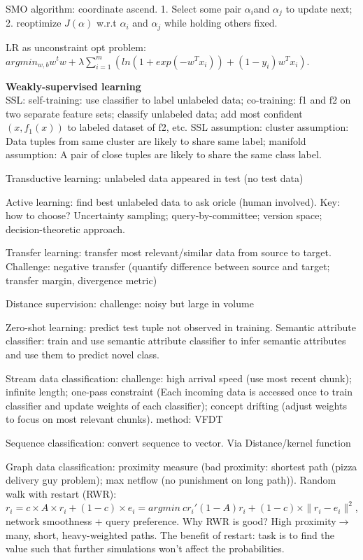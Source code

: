 \documentclass[10pt,twocolumn]{article}
\begin{document}
SMO algorithm: coordinate ascend. 1. Select some pair $\alpha_i$and $\alpha_j$ to update next; 2. reoptimize $J(\alpha)$ w.r.t $\alpha_i$ and $\alpha_j$ while holding others fixed. 

LR as unconstraint opt problem: $argmin_{w,b}w^tw+\lambda\sum_{i=1}^m(ln(1+exp(-w^Tx_i))+(1-y_i)w^Tx_i)$.

\textbf{Weakly-supervised learning}\\ 
SSL: self-training: use classifier to label unlabeled data; co-training: f1 and f2 on two separate feature sets; classify unlabeled data; add most confident $(x, f_1(x))$ to labeled dataset of f2, etc.
SSL assumption: cluster assumption: Data tuples from same cluster are likely to share same label; manifold assumption:  A pair of close tuples are likely to share the same class label. 

Transductive learning: unlabeled data appeared in test (no test data)

Active learning: find best unlabeled data to ask oricle (human involved). Key: how to choose? Uncertainty sampling; query-by-committee; version space; decision-theoretic approach.

Transfer learning: transfer most relevant/similar data from source to target. Challenge: negative transfer (quantify difference between source and target; transfer margin, divergence metric)

Distance supervision: challenge: noisy but large in volume 

Zero-shot learning: predict test tuple not observed in training. Semantic attribute classifier: train and use semantic attribute classifier to infer semantic attributes and use them to predict novel class. 

Stream data classification: challenge: high arrival speed (use most recent chunk); infinite length; one-pass constraint (Each incoming data is accessed once to train classifier and update weights of each classifier); concept drifting (adjust weights to focus on most relevant chunks). method: VFDT

Sequence classification: convert sequence to vector. Via Distance/kernel function 

Graph data classification: proximity measure (bad proximity: shortest path (pizza delivery guy problem); max netflow (no punishment on long path)).
Random walk with restart (RWR): $r_i=c\times A\times r_i+(1-c)\times e_i=argmin\ cr_i'(1-A)r_i+(1-c)\times\|r_i-e_i\|^2$, network smoothness + query preference.
Why RWR is good? High proximity$\rightarrow$ many, short, heavy-weighted paths. The benefit of restart: task is to find the value such that further simulations won't affect the probabilities.
\end{document}
